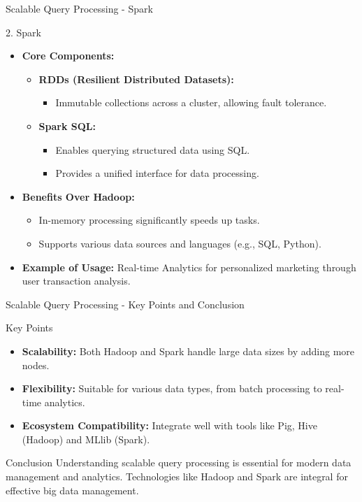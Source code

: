 \documentclass[aspectratio=169]{beamer}
\begin{document}
\begin{frame}[fragile]{Scalable Query Processing - Spark}
  \begin{block}{2. Spark}
    \begin{itemize}
      \item \textbf{Core Components:}
        \begin{itemize}
          \item \textbf{RDDs (Resilient Distributed Datasets):} 
            \begin{itemize}
              \item Immutable collections across a cluster, allowing fault tolerance.
            \end{itemize}
          \item \textbf{Spark SQL:} 
            \begin{itemize}
              \item Enables querying structured data using SQL.
              \item Provides a unified interface for data processing.
            \end{itemize}
        \end{itemize}
      \item \textbf{Benefits Over Hadoop:}
        \begin{itemize}
          \item In-memory processing significantly speeds up tasks.
          \item Supports various data sources and languages (e.g., SQL, Python).
        \end{itemize}
      \item \textbf{Example of Usage:} Real-time Analytics for personalized marketing through user transaction analysis.
    \end{itemize}
  \end{block}
\end{frame}

\begin{frame}[fragile]{Scalable Query Processing - Key Points and Conclusion}
  \begin{block}{Key Points}
    \begin{itemize}
      \item \textbf{Scalability:} Both Hadoop and Spark handle large data sizes by adding more nodes.
      \item \textbf{Flexibility:} Suitable for various data types, from batch processing to real-time analytics.
      \item \textbf{Ecosystem Compatibility:} Integrate well with tools like Pig, Hive (Hadoop) and MLlib (Spark).
    \end{itemize}
  \end{block}
  \begin{block}{Conclusion}
    Understanding scalable query processing is essential for modern data management and analytics. 
    Technologies like Hadoop and Spark are integral for effective big data management.
  \end{block}
\end{frame}
\end{document}
